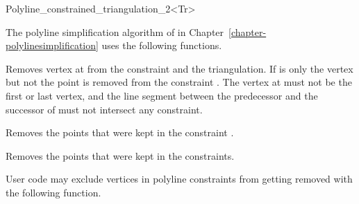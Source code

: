 \begin{ccRefClass}{Polyline_constrained_triangulation_2<Tr>}




The polyline simplification algorithm of in Chapter~\ref{chapter-polylinesimplification}
uses the following functions.

{Removes vertex at  from the constraint and the triangulation.
If  is  only the vertex but not the point is removed from the constraint .
\ccPrecond The vertex at  must not be the first or last vertex, and the line segment between the predecessor  and 
the successor  of  must not intersect any constraint.} 

{Removes the points that were kept in the constraint .}

{Removes the points that were kept in the constraints.}

User code may exclude vertices in polyline constraints from getting removed with 
the following function.


\end{ccRefClass}
